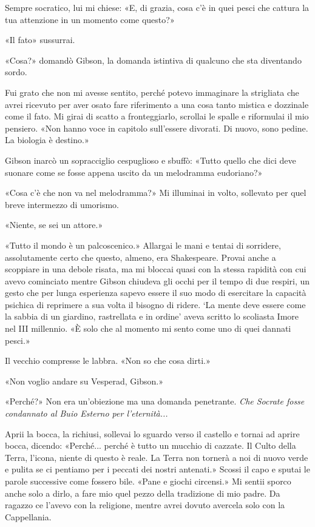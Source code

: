 Sempre socratico, lui mi chiese: «E, di grazia, cosa c'è in quei pesci
che cattura la tua attenzione in un momento come questo?»

«Il fato» sussurrai.

«Cosa?» domandò Gibson, la domanda istintiva di qualcuno che sta
diventando sordo.

Fui grato che non mi avesse sentito, perché potevo immaginare la
strigliata che avrei ricevuto per aver osato fare riferimento a una cosa
tanto mistica e dozzinale come il fato. Mi girai di scatto a
fronteggiarlo, scrollai le spalle e riformulai il mio pensiero. «Non
hanno voce in capitolo sull'essere divorati. Di nuovo, sono pedine. La
biologia è destino.»

Gibson inarcò un sopracciglio cespuglioso e sbuffò: «Tutto quello che
dici deve suonare come se fosse appena uscito da un melodramma
eudoriano?»

«Cosa c'è che non va nel melodramma?» Mi illuminai in volto, sollevato
per quel breve intermezzo di umorismo.

«Niente, se sei un attore.»

«Tutto il mondo è un palcoscenico.» Allargai le mani e tentai di
sorridere, assolutamente certo che questo, almeno, era Shakespeare.
Provai anche a scoppiare in una debole risata, ma mi bloccai quasi con
la stessa rapidità con cui avevo cominciato mentre Gibson chiudeva gli
occhi per il tempo di due respiri, un gesto che per lunga esperienza
sapevo essere il suo modo di esercitare la capacità psichica di
reprimere a sua volta il bisogno di ridere. `La mente deve essere come
la sabbia di un giardino, rastrellata e in ordine' aveva scritto lo
scoliasta Imore nel III millennio. «È solo che al momento mi sento come
uno di quei dannati pesci.»

Il vecchio compresse le labbra. «Non so che cosa dirti.»

«Non voglio andare su Vesperad, Gibson.»

«Perché?» Non era un'obiezione ma una domanda penetrante. \emph{Che
	Socrate fosse condannato al Buio Esterno per l'eternità...}

Aprii la bocca, la richiusi, sollevai lo sguardo verso il castello e
tornai ad aprire bocca, dicendo: «Perché... perché è tutto un mucchio di
cazzate. Il Culto della Terra, l'icona, niente di questo è reale. La
Terra non tornerà a noi di nuovo verde e pulita se ci pentiamo per i
peccati dei nostri antenati.» Scossi il capo e sputai le parole
successive come fossero bile. «Pane e giochi circensi.» Mi sentii sporco
anche solo a dirlo, a fare mio quel pezzo della tradizione di mio padre.
Da ragazzo ce l'avevo con la religione, mentre avrei dovuto avercela
solo con la Cappellania.


